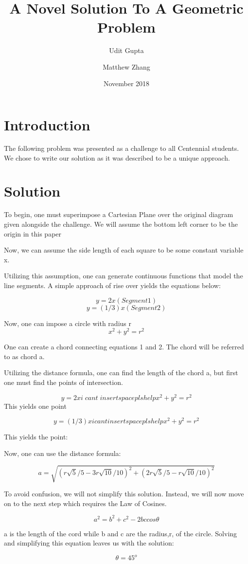 \documentclass{article}
\title{A Novel Solution To A Geometric Problem}
\author{Udit Gupta \and Matthew Zhang}
\date{November 2018}
\begin{document}
\maketitle


\section*{Introduction}
The following problem was presented as a challenge to all Centennial students. We chose to write our solution as it was described to be a unique approach.

\section*{Solution}
To begin, one must superimpose a Cartesian Plane over the original diagram given alongside the challenge. We will assume the bottom left corner to be the origin in this paper

Now, we can assume the side length of each square to be some constant variable x.
 
Utilizing this assumption, one can generate continuous functions that model the line segments. A simple approach of rise over yields the equations below:
 
 $$ y=2x          (Segment 1) $$
 $$  y=(1/3)x (Segment 2)$$
 
 Now, one can impose a circle with radius r $$x^2+y^2=r^2$$
 
 One can create a chord connecting equations 1 and 2. The chord will be referred to as chord a. 
 
 Utilizing the distance formula, one can find the length of the chord a, but first one must find the points of intersection. 
 
 $$ y=2x i\;cant\;insert space pls help x^2+y^2=r^2$$
This yields one point %

$$ y=(1/3)x i cant insert space pls help x^2+y^2=r^2$$



This yields the point: %

Now, one can use the distance formula:

$$ a=\sqrt{(r\sqrt{5}/5-3r\sqrt{10}/10)^2 + (2r\sqrt{5}/5-r\sqrt{10}/10)^2}$$


To avoid confusion, we will not simplify this solution. Instead, we will now move on to the next step which requires the Law of Cosines.

$$ a^2=b^2+c^2-2bccos\theta$$

a is the length of the cord while b and c are the radius,r, of the circle. Solving and simplifying this equation leaves us with the solution:

$$\theta=45^o$$
\end{document}
